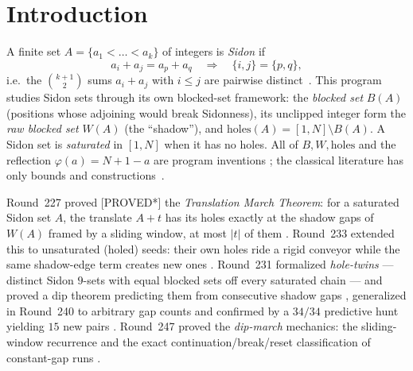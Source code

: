 \documentclass[11pt,a4paper]{article}
\theoremstyle{definition}
\begin{document}
\section{Introduction}

A finite set $A=\{a_1<\dots<a_k\}$ of integers is \emph{Sidon} if
\begin{equation}
  \label{eq:sidon}
  a_i+a_j=a_p+a_q \quad\Longrightarrow\quad \{i,j\}=\{p,q\},
\end{equation}
i.e.\ the $\binom{k+1}{2}$ sums $a_i+a_j$ with $i\le j$ are pairwise
distinct~\cite{ET41}. This program studies Sidon sets through its own
blocked-set framework: the \emph{blocked set} $B(A)$ (positions whose
adjoining would break Sidonness), its unclipped integer form the
\emph{raw blocked set} $W(A)$ (the ``shadow''), and
$\mathrm{holes}(A)=[1,N]\setminus B(A)$. A Sidon set is
\emph{saturated} in $[1,N]$ when it has no holes. All of
$B,W,\mathrm{holes}$ and the reflection
$\varphi(a)=N+1-a$ are program inventions
\cite{D201,D213,D215,D227}; the classical literature has only bounds
and constructions~\cite{ET41}.

Round~227 proved [PROVED*] the \emph{Translation March Theorem}: for a
saturated Sidon set $A$, the translate $A+t$ has its holes exactly at
the shadow gaps of $W(A)$ framed by a sliding window, at most $|t|$ of
them \cite{D227}. Round~233 extended this to unsaturated (holed)
seeds: their own holes ride a rigid conveyor while the same
shadow-edge term creates new ones \cite{D233}. Round~231 formalized
\emph{hole-twins} --- distinct Sidon $9$-sets with equal blocked sets
off every saturated chain --- and proved a dip theorem predicting them
from consecutive shadow gaps \cite{D231}, generalized in
Round~240 to arbitrary gap counts and confirmed by a $34/34$ predictive
hunt yielding $15$ new pairs \cite{D240,D243}. Round~247 proved the
\emph{dip-march} mechanics: the sliding-window recurrence and the
exact continuation/break/reset classification of constant-gap runs
\cite{D247}.
\end{document}
